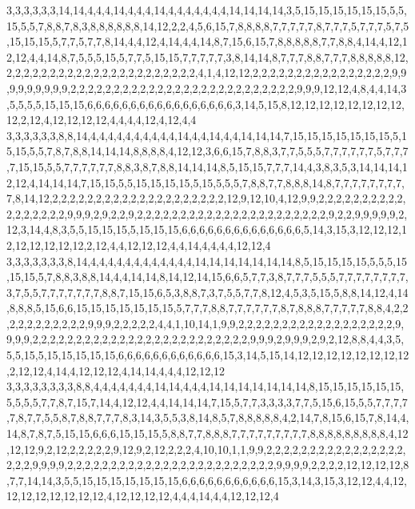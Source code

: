 3,3,3,3,3,3,14,14,4,4,4,14,4,4,4,14,4,4,4,4,4,4,4,14,14,14,14,3,5,15,15,15,15,15,15,5,5,15,5,5,7,8,8,7,8,3,8,8,8,8,8,8,14,12,2,2,4,5,6,15,7,8,8,8,8,7,7,7,7,7,8,7,7,7,5,7,7,7,5,7,5,15,15,15,5,7,7,5,7,7,8,14,4,4,12,4,14,4,4,14,8,7,15,6,15,7,8,8,8,8,8,7,7,8,8,4,14,4,12,12,12,4,4,14,8,7,5,5,5,15,5,7,7,5,15,15,7,7,7,7,7,3,8,14,14,8,7,7,7,8,8,7,7,7,8,8,8,8,8,12,2,2,2,2,2,2,2,2,2,2,2,2,2,2,2,2,2,2,2,2,2,2,4,1,4,12,12,2,2,2,2,2,2,2,2,2,2,2,2,2,2,2,2,9,9,9,9,9,9,9,9,9,2,2,2,2,2,2,2,2,2,2,2,2,2,2,2,2,2,2,2,2,2,2,2,2,2,2,9,9,9,12,12,4,8,4,4,14,3,5,5,5,5,15,15,15,6,6,6,6,6,6,6,6,6,6,6,6,6,6,6,6,6,3,14,5,15,8,12,12,12,12,12,12,12,12,12,2,12,4,12,12,12,12,4,4,4,4,12,4,12,4,4
3,3,3,3,3,3,8,8,14,4,4,4,4,4,4,4,4,4,4,14,4,4,14,4,4,14,14,14,7,15,15,15,15,15,15,15,5,15,15,5,5,7,8,7,8,8,14,14,14,8,8,8,8,4,12,12,3,6,6,15,7,8,8,3,7,7,5,5,5,7,7,7,7,7,7,5,7,7,7,7,15,15,5,5,7,7,7,7,7,7,8,8,3,8,7,8,8,14,14,14,8,5,15,15,7,7,7,14,4,3,8,3,5,3,14,14,14,12,12,4,14,14,14,7,15,15,5,5,15,15,15,15,5,15,5,5,5,7,8,8,7,7,8,8,8,14,8,7,7,7,7,7,7,7,7,7,8,14,12,2,2,2,2,2,2,2,2,2,2,2,2,2,2,2,2,2,2,2,2,12,9,12,10,4,12,9,9,2,2,2,2,2,2,2,2,2,2,2,2,2,2,2,2,2,9,9,9,2,9,2,2,9,2,2,2,2,2,2,2,2,2,2,2,2,2,2,2,2,2,2,2,2,2,2,9,2,2,9,9,9,9,9,2,12,3,14,4,8,3,5,5,15,15,15,5,15,15,15,6,6,6,6,6,6,6,6,6,6,6,6,6,6,5,14,3,15,3,12,12,12,12,12,12,12,12,12,2,12,4,4,12,12,12,4,4,14,4,4,4,4,12,12,4
3,3,3,3,3,3,3,8,14,4,4,4,4,4,4,4,4,4,4,4,4,14,14,14,14,14,14,14,8,5,15,15,15,15,5,5,5,15,15,15,5,7,8,8,3,8,8,14,4,4,14,14,8,14,12,14,15,6,6,5,7,7,3,8,7,7,7,5,5,5,7,7,7,7,7,7,7,7,3,7,5,5,7,7,7,7,7,7,7,8,8,7,15,15,6,5,3,8,8,7,3,7,5,5,7,7,8,12,4,5,3,5,15,5,8,8,14,12,4,14,8,8,8,5,15,6,6,15,15,15,15,15,15,15,5,7,7,7,8,8,7,7,7,7,7,7,8,7,8,8,8,7,7,7,7,7,8,8,4,2,2,2,2,2,2,2,2,2,2,2,9,9,9,2,2,2,2,2,4,4,1,10,14,1,9,9,2,2,2,2,2,2,2,2,2,2,2,2,2,2,2,2,2,2,9,9,9,9,2,2,2,2,2,2,2,2,2,2,2,2,2,2,2,2,2,2,2,2,2,2,2,2,2,9,9,9,2,9,9,9,2,9,2,12,8,8,4,4,3,5,5,5,15,5,15,15,15,15,15,6,6,6,6,6,6,6,6,6,6,6,6,15,3,14,5,15,14,12,12,12,12,12,12,12,12,2,12,12,4,14,4,12,12,12,4,14,14,4,4,4,12,12,12
3,3,3,3,3,3,3,3,8,8,4,4,4,4,4,4,4,14,14,4,4,4,14,14,14,14,14,14,14,8,15,15,15,15,15,15,5,5,5,5,7,7,8,7,15,7,14,4,12,12,4,4,14,14,14,7,15,5,7,7,3,3,3,3,7,7,5,15,6,15,5,5,7,7,7,7,7,8,7,7,5,5,8,7,8,8,7,7,7,8,3,14,3,5,5,3,8,14,8,5,7,8,8,8,8,8,4,2,14,7,8,15,6,15,7,8,14,4,14,8,7,8,7,5,15,15,6,6,6,15,15,15,5,8,8,7,7,8,8,8,7,7,7,7,7,7,7,7,7,8,8,8,8,8,8,8,8,8,4,12,12,12,9,2,12,2,2,2,2,2,9,12,9,2,12,2,2,2,4,10,10,1,1,9,9,2,2,2,2,2,2,2,2,2,2,2,2,2,2,2,2,2,2,2,9,9,9,9,2,2,2,2,2,2,2,2,2,2,2,2,2,2,2,2,2,2,2,2,2,2,2,2,9,9,9,9,2,2,2,2,12,12,12,12,8,7,7,14,14,3,5,5,15,15,15,15,15,15,15,6,6,6,6,6,6,6,6,6,6,6,15,3,14,3,15,3,12,12,4,4,12,12,12,12,12,12,12,12,4,12,12,12,12,4,4,4,14,4,4,12,12,12,4
